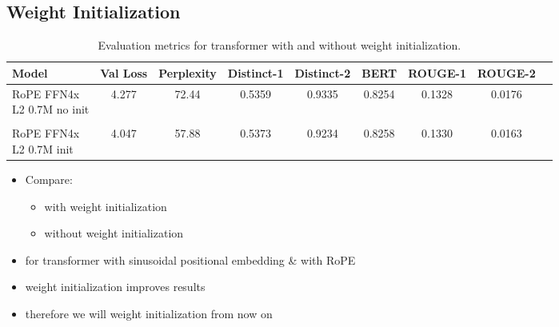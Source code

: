 \subsection*{Weight Initialization} \label{subsec:weight-init}
\begin{table}[h!]
    \centering
    \begin{tabular}{lcccccccc}
        \hline
        Model                                      & Val Loss & Perplexity & Distinct-1 & Distinct-2 &   BERT & ROUGE-1 & ROUGE-2\\
        \hline
        \makecell[l]{RoPE FFN4x\\ L2 0.7M no init} &    4.277 &      72.44 &     0.5359 &     0.9335 & 0.8254 &  0.1328 & 0.0176 \\
        \vspace{1sp}\\
        \makecell[l]{RoPE FFN4x\\ L2 0.7M init}    &    4.047 &      57.88 &     0.5373 &     0.9234 & 0.8258 &  0.1330 & 0.0163 \\
        \hline
    \end{tabular}
    \caption{Evaluation metrics for transformer with and without weight initialization.}
\end{table}
\begin{itemize}
    \item Compare:
    \begin{itemize}
        \item with weight initialization
        \item without weight initialization
    \end{itemize}
    \item for transformer with sinusoidal positional embedding \& with RoPE
    \item weight initialization improves results
    \item therefore we will weight initialization from now on
\end{itemize}




